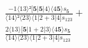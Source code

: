 \documentclass[varwidth, border=5pt]{standalone}
\begin{document}
\begin{my}
$\begin{gathered}
\scriptscriptstyle\frac{-1⟨13⟩²[𝟓|𝟓|4⟩⟨4𝟓⟩s_{𝟓}}{⟨14⟩²⟨23⟩⟨1|2+3|4]s_{123}} +\\
\scriptscriptstyle\frac{2⟨13⟩[𝟓|1+2|3⟩⟨4𝟓⟩s_{𝟓}}{⟨14⟩⟨23⟩⟨1|2+3|4]s_{123}} \phantom{+}
\end{gathered}$
\end{my}
\end{document}
